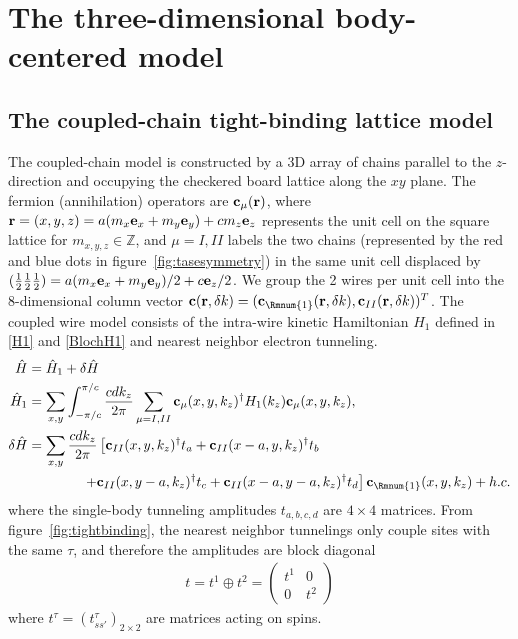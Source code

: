 \section{The three-dimensional body-centered model}

\subsection{The coupled-chain tight-binding lattice model}
The coupled-chain model is constructed by a 3D array of chains parallel to the $z$-direction and occupying the checkered board lattice along the $xy$ plane. The fermion (annihilation) operators are ${\bf c}_\mu({\bf r})$, where ${\bf r}=(x,y,z)=a(m_x{\bf e}_x+m_y{\bf e}_y)+cm_z{\bf e}_z$ represents the unit cell on the square lattice for $m_{x,y,z}\in\mathbb{Z}$, and $\mu=I,II$ labels the two chains (represented by the red and blue dots in figure~\ref{fig:tasesymmetry}) in the same unit cell displaced by $(\frac{1}{2}\frac{1}{2}\frac{1}{2})=a(m_x{\bf e}_x+m_y{\bf e}_y)/2+c{\bf e}_z/2$. We group the 2 wires per unit cell into the 8-dimensional column vector ${\bf c}({\bf r},\delta k)=({\bf c}_{\Rmnum{1}}({\bf r},\delta k),{\bf c}_{II}({\bf r},\delta k))^T$. The coupled wire model consists of the intra-wire kinetic Hamiltonian $\hat{H}_1$ defined in \eqref{H1} and \eqref{BlochH1} and nearest neighbor electron tunneling. 
\begin{align}\hat{H}&=\hat{H}_1+\delta\hat{H}\label{CWM1}\\\hat{H}_1&=\sum_{x,y}\int_{-\pi/c}^{\pi/c}\frac{cdk_z}{2\pi}\sum_{\mu=I,II}{\bf c}_\mu(x,y,k_z)^\dagger H_1(k_z){\bf c}_\mu(x,y,k_z),\nonumber\\\delta\hat{H}&=\sum_{x,y}\frac{cdk_z}{2\pi}\left[{\bf c}_{II}(x,y,k_z)^\dagger t_a+{\bf c}_{II}(x-a,y,k_z)^\dagger t_b\right.\nonumber\\&\quad\quad\quad\quad\left.+{\bf c}_{II}(x,y-a,k_z)^\dagger t_c+{\bf c}_{II}(x-a,y-a,k_z)^\dagger t_d\right]{\bf c}_{\Rmnum{1}}(x,y,k_z)+h.c.\nonumber\end{align} where the single-body tunneling amplitudes $t_{a,b,c,d}$ are $4\times4$ matrices. From figure~\ref{fig:tightbinding}, the nearest neighbor tunnelings only couple sites with the same $\tau$, and therefore the amplitudes are block diagonal \begin{align}t=t^1\oplus t^2=\begin{pmatrix}t^1&0\\0&t^2\end{pmatrix}\label{chainhoppings}\end{align} where $t^\tau=(t^\tau_{ss'})_{2\times2}$ are matrices acting on spins.

